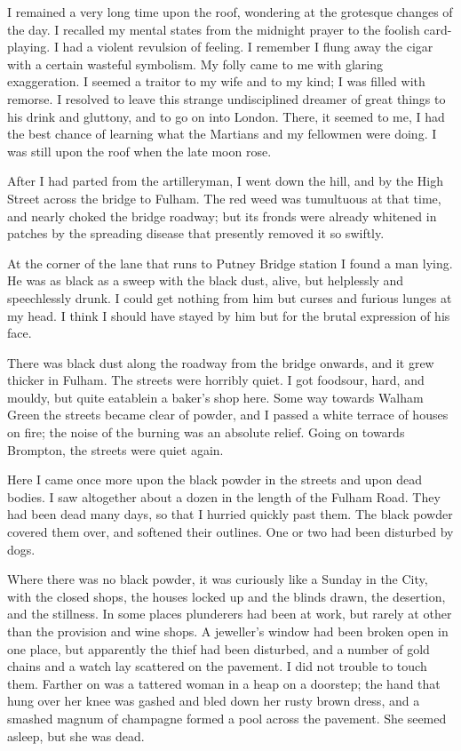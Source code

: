 I remained a very long time upon the roof, wondering at the
grotesque changes of the day. I recalled my mental states from the
midnight prayer to the foolish card-playing. I had a violent
revulsion of feeling. I remember I flung away the cigar with a
certain wasteful symbolism. My folly came to me with glaring
exaggeration. I seemed a traitor to my wife and to my kind; I was
filled with remorse. I resolved to leave this strange undisciplined
dreamer of great things to his drink and gluttony, and to go on
into London. There, it seemed to me, I had the best chance of
learning what the Martians and my fellowmen were doing. I was still
upon the roof when the late moon rose.

After I had parted from the artilleryman, I went down the hill, and
by the High Street across the bridge to Fulham. The red weed was
tumultuous at that time, and nearly choked the bridge roadway; but
its fronds were already whitened in patches by the spreading
disease that presently removed it so swiftly.

At the corner of the lane that runs to Putney Bridge station I
found a man lying. He was as black as a sweep with the black dust,
alive, but helplessly and speechlessly drunk. I could get nothing
from him but curses and furious lunges at my head. I think I should
have stayed by him but for the brutal expression of his face.

There was black dust along the roadway from the bridge onwards, and
it grew thicker in Fulham. The streets were horribly quiet. I got
food\dash{}sour, hard, and mouldy, but quite eatable\dash{}in a baker's shop
here. Some way towards Walham Green the streets became clear of
powder, and I passed a white terrace of houses on fire; the noise
of the burning was an absolute relief. Going on towards Brompton,
the streets were quiet again.

Here I came once more upon the black powder in the streets and upon
dead bodies. I saw altogether about a dozen in the length of the
Fulham Road. They had been dead many days, so that I hurried
quickly past them. The black powder covered them over, and softened
their outlines. One or two had been disturbed by dogs.

Where there was no black powder, it was curiously like a Sunday in
the City, with the closed shops, the houses locked up and the
blinds drawn, the desertion, and the stillness. In some places
plunderers had been at work, but rarely at other than the provision
and wine shops. A jeweller's window had been broken open in one
place, but apparently the thief had been disturbed, and a number of
gold chains and a watch lay scattered on the pavement. I did not
trouble to touch them. Farther on was a tattered woman in a heap on
a doorstep; the hand that hung over her knee was gashed and bled
down her rusty brown dress, and a smashed magnum of champagne
formed a pool across the pavement. She seemed asleep, but she was
dead.

